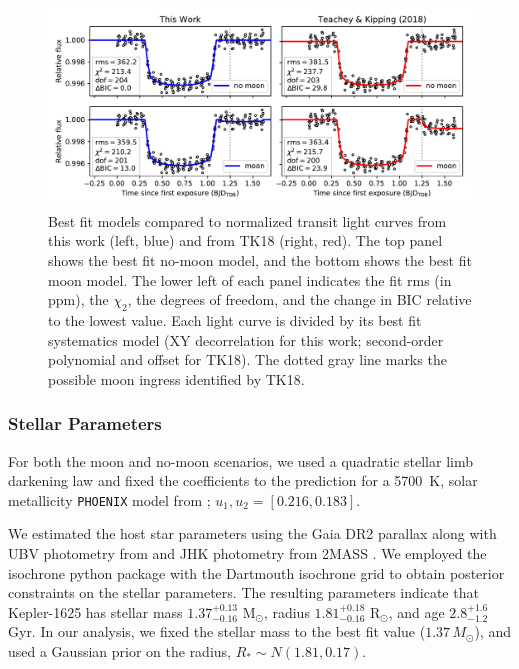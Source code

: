 \documentclass[twocolumn]{aastex62}
\begin{document}
\begin{figure}
\includegraphics[width = 1.0 \textwidth]{figures/fig3_bestfits.pdf}
    \caption{Best fit models compared to normalized transit light curves from this work (left, blue) and from TK18 (right, red). The top panel shows the best fit no-moon model, and the bottom shows the best fit moon model. The lower left of each panel indicates the fit rms (in ppm), the $\chi_2$, the degrees of freedom, and the change in BIC relative to the lowest value.  Each light curve is divided by its best fit systematics model (XY decorrelation for this work; second-order polynomial and offset for TK18).  The dotted gray line marks the possible moon ingress identified by TK18.}
\label{fig:bestfit}
\end{figure}


\subsubsection{Stellar Parameters}
For both the moon and no-moon scenarios, we used a quadratic stellar limb darkening law and fixed the coefficients to the prediction for a 5700~K, solar metallicity \texttt{PHOENIX} model from \cite{espinoza15}; $u_1, u_2 = [0.216, 0.183]$.  

We estimated the host star parameters using the Gaia DR2 parallax \citep{Gaia, GaiaDR2} along with UBV photometry from \citet{Everett2012} and JHK photometry from 2MASS \citep{2MASS}. We employed the isochrone python package \citep{isochrone} with the Dartmouth isochrone grid \citep{Dotter2008} to obtain posterior constraints on the stellar parameters. The resulting parameters indicate that Kepler-1625 has stellar mass $1.37^{+0.13}_{-0.16}$ M$_{\odot}$, radius $1.81^{+0.18}_{-0.16}$ R$_{\odot}$, and age $2.8^{+1.6}_{-1.2}$ Gyr. In our analysis, we fixed the stellar mass to the best fit value ($1.37\,M_\odot$), and used a Gaussian prior on the radius, $R_* \sim N(1.81, 0.17)$.
\end{document}
